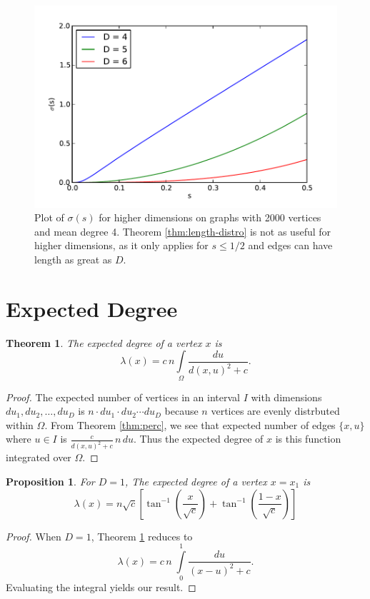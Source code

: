 \documentclass[a4paper,10pt]{article}
\newtheorem{prop}{Proposition}
\newtheorem{theorem}{Theorem}
\begin{document}
\begin{figure}
 \centering
 \includegraphics[scale=.7]{images/sigma_multi.pdf}
 \caption{Plot of $\sigma(s)$ for higher dimensions on graphs with 2000 vertices and mean degree 4. Theorem \ref{thm:length-distro} is not as useful for higher dimensions, as it only applies for $s \leq 1/2$ and edges can have length as great as $D$. }
\end{figure}

\section{Expected Degree}
\begin{theorem}
\label{thm:lambdax}
The expected degree of a vertex $x$ is
 \begin{equation}
 \lambda(x) = c\,n\int\limits_\Omega \frac{du}{d(x, u)^2 + c}.
\end{equation}
\end{theorem}
\begin{proof}
The expected number of vertices in an interval $I$ with dimensions $du_1, du_2, \ldots, du_D$  is $n \cdot du_1 \cdot du_2 \cdots du_D$ because $n$ vertices are evenly distrbuted within $\Omega$. From Theorem \ref{thm:perc}, we see that expected number of edges $\{x, u\}$ where $u \in I$ is $\frac{c}{d(x, u)^2 + c} \, n \, du$. Thus the expected degree of $x$ is this function integrated over $\Omega$.
\end{proof}

\begin{prop}
\label{prop:lambdax1}
For $D = 1$, The expected degree of a vertex $x = x_1$ is
 \begin{equation}
 \lambda(x) = n\sqrt{c}\left[\tan^{-1}\left(\frac{x}{\sqrt{c}}\right)+\tan^{-1}\left(\frac{1-x}{\sqrt{c}}\right)\right]
\end{equation}
\end{prop}
\begin{proof}
When $D=1$, Theorem \ref{thm:lambdax} reduces to
\begin{equation}
 \lambda(x) = c\,n\;\int\limits_{0}^{1} \frac{du}{(x - u)^2 + c}.
\end{equation}
Evaluating the integral yields our result.
\end{proof}
\end{document}
